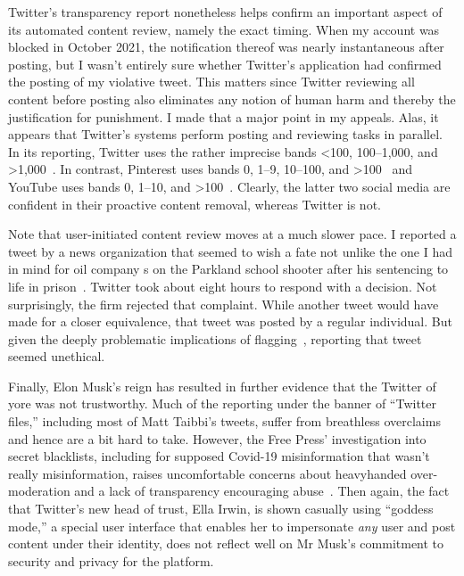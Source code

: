 Twitter's transparency report nonetheless helps confirm an important aspect of
its automated content review, namely the exact timing. When my account was
blocked in October 2021, the notification thereof was nearly instantaneous after
posting, but I wasn't entirely sure whether Twitter's application had confirmed
the posting of my violative tweet. This matters since Twitter reviewing all
content before posting also eliminates any notion of human harm and thereby the
justification for punishment. I made that a major point in my appeals. Alas, it
appears that Twitter's systems perform posting and reviewing tasks in parallel.
In its reporting, Twitter uses the rather imprecise bands <100, 100--1,000, and
>1,000~\cite{Twitter2021}. In contrast, Pinterest uses bands 0, 1--9, 10--100,
and >100~\cite{Pinterest2022} and YouTube uses bands 0, 1--10, and
>100~\cite{Google2022}. Clearly, the latter two social media are confident in
their proactive content removal, whereas Twitter is not.

Note that user-initiated content review moves at a much slower pace. I reported
a tweet by a news organization that seemed to wish a fate not unlike the one I
had in mind for oil company s on the Parkland school shooter after his
sentencing to life in prison~\cite{ShapiroDeliso2022}. Twitter took about eight
hours to respond with a decision. Not surprisingly, the firm rejected that
complaint. While another tweet would have made for a closer equivalence, that
tweet was posted by a regular individual. But given the deeply problematic
implications of flagging~\cite{CrawfordGillespie2016}, reporting that tweet
seemed unethical.

Finally, Elon Musk's reign has resulted in further evidence that the Twitter of
yore was not trustworthy. Much of the reporting under the banner of ``Twitter
files,'' including most of Matt Taibbi's tweets, suffer from breathless
overclaims and hence are a bit hard to take. However, the Free Press'
investigation into secret blacklists, including for supposed Covid-19
misinformation that wasn't really misinformation, raises uncomfortable concerns
about heavyhanded over-moderation and a lack of transparency encouraging
abuse~\cite{WeissShrierea2022,Zweig2022}. Then again, the fact that Twitter's
new head of trust, Ella Irwin, is shown casually using ``goddess mode,'' a
special user interface that enables her to impersonate \emph{any} user and post
content under their identity, does not reflect well on Mr Musk's commitment to
security and privacy for the platform.
